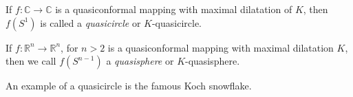 \documentclass[12pt]{article}
\begin{document}
If $f : {\mathbb{C}} \rightarrow {\mathbb{C}}$ is a quasiconformal mapping with maximal dilatation of $K$,
then $f(S^1)$ is called a {\em quasicircle} or $K$-quasicircle.

If $f : {\mathbb{R}}^n \rightarrow {\mathbb{R}}^n$, for $n > 2$ is a quasiconformal mapping with maximal dilatation $K$, then we call $f(S^{n-1})$ a {\em quasisphere} or
$K$-quasisphere.

An example of a quasicircle is the famous Koch snowflake.
\end{document}
